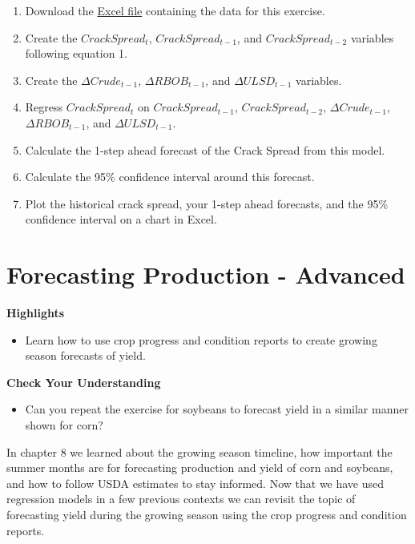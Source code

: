\documentclass[
]{book}
\providecommand{\tightlist}{%
  \setlength{\itemsep}{0pt}\setlength{\parskip}{0pt}}
\begin{document}
\begin{enumerate}
\def\labelenumi{\arabic{enumi}.}
\item
  Download the \href{Excel-files/CrackSpread.csv}{Excel file} containing the data for this exercise.
\item
  Create the \(CrackSpread_t\), \(CrackSpread_{t-1}\), and \(CrackSpread_{t-2}\) variables following equation 1.
\item
  Create the \(\Delta Crude_{t-1}\), \(\Delta RBOB_{t-1}\), and \(\Delta ULSD_{t-1}\) variables.
\item
  Regress \(CrackSpread_t\) on \(CrackSpread_{t-1}\), \(CrackSpread_{t-2}\), \(\Delta Crude_{t-1}\), \(\Delta RBOB_{t-1}\), and \(\Delta ULSD_{t-1}\).
\item
  Calculate the 1-step ahead forecast of the Crack Spread from this model.
\item
  Calculate the 95\% confidence interval around this forecast.
\item
  Plot the historical crack spread, your 1-step ahead forecasts, and the 95\% confidence interval on a chart in Excel.
\end{enumerate}

\hypertarget{forecasting-production---advanced}{%
\chapter{Forecasting Production - Advanced}\label{forecasting-production---advanced}}

\textbf{Highlights}

\begin{itemize}
\tightlist
\item
  Learn how to use crop progress and condition reports to create growing season forecasts of yield.
\end{itemize}

\textbf{Check Your Understanding}

\begin{itemize}
\tightlist
\item
  Can you repeat the exercise for soybeans to forecast yield in a similar manner shown for corn?
\end{itemize}

In chapter 8 we learned about the growing season timeline, how important the summer months are for forecasting production and yield of corn and soybeans, and how to follow USDA estimates to stay informed. Now that we have used regression models in a few previous contexts we can revisit the topic of forecasting yield during the growing season using the crop progress and condition reports.
\end{document}
